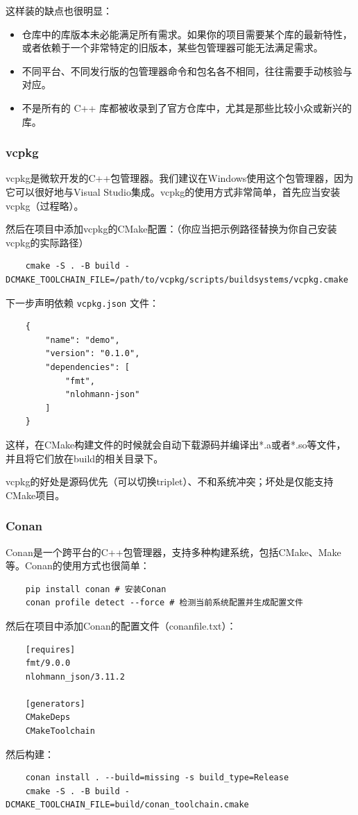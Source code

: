 这样装的缺点也很明显：
\begin{itemize}
    \item 仓库中的库版本未必能满足所有需求。如果你的项目需要某个库的最新特性，或者依赖于一个非常特定的旧版本，某些包管理器可能无法满足需求。
    \item 不同平台、不同发行版的包管理器命令和包名各不相同，往往需要手动核验与对应。
    \item 不是所有的 C++ 库都被收录到了官方仓库中，尤其是那些比较小众或新兴的库。
\end{itemize}

\subsubsection{vcpkg}

vcpkg是微软开发的C++包管理器。我们建议在Windows使用这个包管理器，因为它可以很好地与Visual Studio集成。vcpkg的使用方式非常简单，首先应当安装vcpkg（过程略）。

然后在项目中添加vcpkg的CMake配置：（你应当把示例路径替换为你自己安装vcpkg的实际路径）
\begin{verbatim}
    cmake -S . -B build -DCMAKE_TOOLCHAIN_FILE=/path/to/vcpkg/scripts/buildsystems/vcpkg.cmake
\end{verbatim}
下一步声明依赖 \texttt{vcpkg.json} 文件：
\begin{verbatim}
    {
        "name": "demo",
        "version": "0.1.0",
        "dependencies": [
            "fmt",
            "nlohmann-json"
        ]
    }
\end{verbatim}
这样，在CMake构建文件的时候就会自动下载源码并编译出*.a或者*.so等文件，并且将它们放在build的相关目录下。

vcpkg的好处是源码优先（可以切换triplet）、不和系统冲突；坏处是仅能支持CMake项目。

\subsubsection{Conan}

Conan是一个跨平台的C++包管理器，支持多种构建系统，包括CMake、Make等。Conan的使用方式也很简单：
\begin{verbatim}
    pip install conan # 安装Conan
    conan profile detect --force # 检测当前系统配置并生成配置文件
\end{verbatim}
然后在项目中添加Conan的配置文件（conanfile.txt）：
\begin{verbatim}
    [requires]
    fmt/9.0.0
    nlohmann_json/3.11.2

    [generators]
    CMakeDeps
    CMakeToolchain
\end{verbatim}
然后构建：
\begin{verbatim}
    conan install . --build=missing -s build_type=Release
    cmake -S . -B build -DCMAKE_TOOLCHAIN_FILE=build/conan_toolchain.cmake
\end{verbatim}


